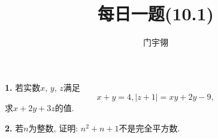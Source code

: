 \documentclass{article}
\title{每日一题(10.1)}
\author{\kaishu 门宇翎}
\begin{document}
\maketitle
\textbf{1. }若实数$x$, $y$, $z$满足
\[x+y=4, |z+1|=xy+2y-9,\]
求$x+2y+3z$的值.\\\par
\textbf{2. }若$n$为整数, 证明: $n^2+n+1$不是完全平方数. 
\end{document}
